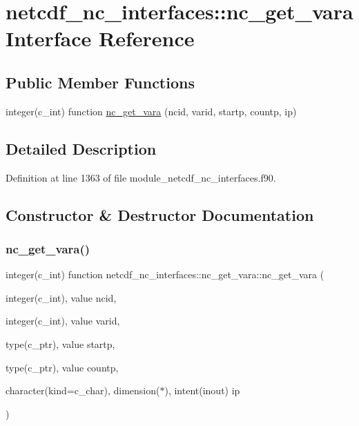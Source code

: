 \hypertarget{interfacenetcdf__nc__interfaces_1_1nc__get__vara}{}\section{netcdf\+\_\+nc\+\_\+interfaces\+:\+:nc\+\_\+get\+\_\+vara Interface Reference}
\label{interfacenetcdf__nc__interfaces_1_1nc__get__vara}
\subsection*{Public Member Functions}
\begin{DoxyCompactItemize}
\item 
integer(c\+\_\+int) function \hyperlink{interfacenetcdf__nc__interfaces_1_1nc__get__vara_a4333c347b3adf0beb565c736da2deb79}{nc\+\_\+get\+\_\+vara} (ncid, varid, startp, countp, ip)
\end{DoxyCompactItemize}


\subsection{Detailed Description}


Definition at line 1363 of file module\+\_\+netcdf\+\_\+nc\+\_\+interfaces.\+f90.



\subsection{Constructor \& Destructor Documentation}
\mbox{\label{interfacenetcdf__nc__interfaces_1_1nc__get__vara_a4333c347b3adf0beb565c736da2deb79}} 
\subsubsection{\texorpdfstring{nc\+\_\+get\+\_\+vara()}{nc\_get\_vara()}}
{\footnotesize\ttfamily integer(c\+\_\+int) function netcdf\+\_\+nc\+\_\+interfaces\+::nc\+\_\+get\+\_\+vara\+::nc\+\_\+get\+\_\+vara (\begin{DoxyParamCaption}\item[{integer(c\+\_\+int), value}]{ncid,  }\item[{integer(c\+\_\+int), value}]{varid,  }\item[{type(c\+\_\+ptr), value}]{startp,  }\item[{type(c\+\_\+ptr), value}]{countp,  }\item[{character(kind=c\+\_\+char), dimension($\ast$), intent(inout)}]{ip }\end{DoxyParamCaption})}



